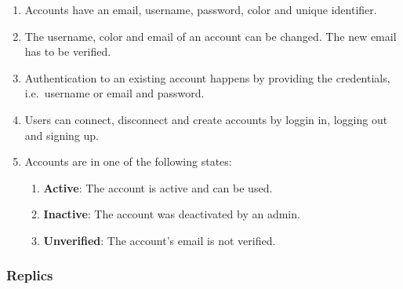 \begin{enumerate}[label=\textit{AC \arabic*}]
    \item \label{ac:accounts:1} Accounts have an email, username, password, color and unique identifier.
    \item \label{ac:accounts:2} The username, color and email of an account can be changed.
    The new email has to be verified.
    \item \label{ac:accounts:3} Authentication to an existing account happens by providing the credentials, i.e.\ username or email and password.
    \item \label{ac:accounts:4} Users can connect, disconnect and create accounts by loggin in, logging out and signing up.
    \item \label{ac:accounts:5} Accounts are in one of the following states:
    \begin{enumerate}
        \item \textbf{Active}: The account is active and can be used.
        \item \textbf{Inactive}: The account was deactivated by an admin.
        \item \textbf{Unverified}: The account's email is not verified.
    \end{enumerate}
\end{enumerate}

\subsubsection{Replics}

